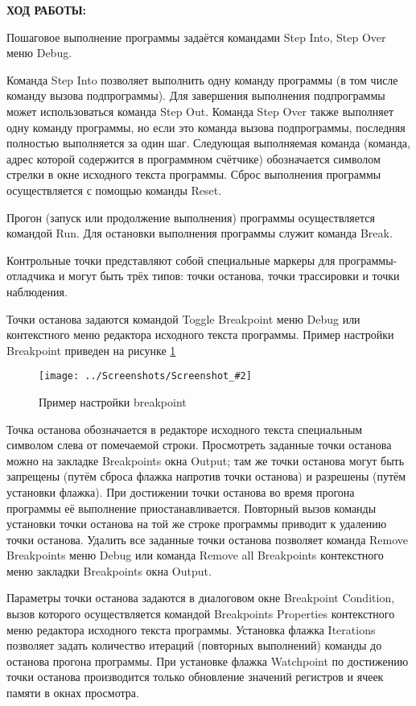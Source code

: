 \documentclass[14pt,a4paper]{extreport}
\newcommand{\sshot}[2]{\begin{figure}[ht]%
\centering\texttt{[image: ../Screenshots/Screenshot\_\#2]}%
\caption{#1}%
\label{sshot#2}%
\end{figure}%
}
\newcommand{\header}[1]{%
{
\clearpage%
\fontsize{16pt}{14pt}\selectfont
\begin{center}
\textbf{\MakeUppercase{#1}:}
\end{center}
}
}
\begin{document}
\header{Ход работы}


Пошаговое выполнение программы задаётся командами Step Into, Step Over меню Debug. 

Команда Step Into позволяет выполнить одну команду программы (в том числе команду вызова подпрограммы). Для завершения выполнения подпрограммы может использоваться команда Step Out. Команда Step Over также выполняет одну команду программы, но если это команда вызова подпрограммы, последняя полностью выполняется за один шаг. Следующая выполняемая команда (команда, адрес которой содержится в программном счётчике) обозначается символом стрелки в окне исходного текста программы. Сброс выполнения программы осуществляется с помощью команды Reset.

	Прогон (запуск или продолжение выполнения) программы осуществляется командой Run. Для остановки выполнения программы служит команда Break.

	Контрольные точки представляют собой специальные маркеры для программы-отладчика и могут быть трёх типов: точки останова, точки трассировки и точки наблюдения.

	Точки останова задаются командой Toggle Breakpoint меню Debug или контекстного меню редактора исходного текста программы. Пример настройки Breakpoint приведен на рисунке \ref{sshot1}

\sshot{Пример настройки breakpoint}{1}

	Точка останова обозначается в редакторе исходного текста специальным символом слева от помечаемой строки. Просмотреть заданные точки останова можно на закладке Breakpoints окна Output; там же точки останова могут быть запрещены (путём сброса флажка напротив точки останова) и разрешены (путём установки флажка). При достижении точки останова во время прогона программы её выполнение приостанавливается. Повторный вызов команды установки точки останова на той же строке программы приводит к удалению точки останова. Удалить все заданные точки останова позволяет команда Remove Breakpoints меню Debug или команда Remove all Breakpoints контекстного меню закладки Breakpoints окна Output.
	
	Параметры точки останова задаются в диалоговом окне Breakpoint Condition, вызов которого осуществляется командой Breakpoints Properties контекстного меню редактора исходного текста программы. Установка флажка Iterations позволяет задать количество итераций (повторных выполнений) команды до останова прогона программы. При установке флажка Watchpoint по достижению точки останова производится только обновление значений регистров и ячеек памяти в окнах просмотра. 
	
\end{document}
